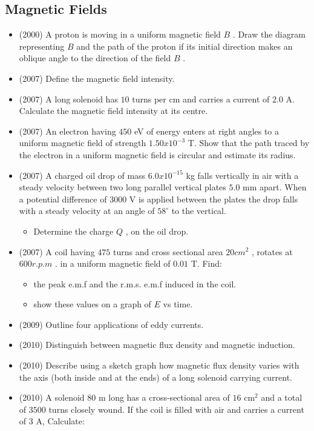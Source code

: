 \documentclass{article}
\begin{document}
\subsection{Magnetic Fields}
\begin{itemize}
\item (2000)  A proton is moving in a uniform magnetic field $ B$ . Draw the diagram representing $ B$ and the path of the proton if its initial direction makes an oblique angle to the direction of the field $ B$ . 
\item (2007)  Define the magnetic field intensity.
\item (2007)  A long solenoid has $ 10$ turns per cm and carries a current of $ 2.0$ A.  Calculate the magnetic field intensity at its centre.
\item (2007)  An electron having $ 450$ eV of energy enters at right angles to a uniform magnetic field of strength $ 1.50x10^{-3}$ T.  Show that the path traced by the electron in a uniform magnetic field is circular and estimate its radius.
\item (2007)  A charged oil drop of mass $ 6.0x10^{-15}$ kg falls vertically in air with a steady velocity between two long parallel vertical plates $ 5.0$ mm apart.  When a potential difference of $ 3000$ V is applied between the plates the drop falls with a steady velocity at an angle of $ 58^{\circ}$ to the vertical.\begin{itemize}
\item Determine the charge $ Q$ , on the oil drop.
\end{itemize}
\item (2007)  A coil having $ 475$ turns and cross sectional area $ 20 cm^{2}$ , rotates at $ 600r.p.m$ . in a uniform magnetic field of $ 0.01$ T. Find:\begin{itemize}
\item the peak e.m.f and the r.m.s. e.m.f induced in the coil. 
\item show these values on a graph of $ E$ vs time. 
\end{itemize}
\item (2009)  Outline four applications of eddy currents.
\item (2010)  Distinguish between magnetic flux density and magnetic induction.
\item (2010)  Describe using a sketch graph how magnetic flux density varies with the axis (both inside and at the ends) of a long solenoid carrying current. 
\item (2010)  A solenoid $ 80$ m long has a cross-sectional area of $ 16$ cm$ ^{2}$ and a total of $ 3500$ turns closely wound. If the coil is filled with air and carries a current of $ 3$ A, Calculate:\begin{itemize}

\end{itemize}
\end{itemize}
\end{document}

